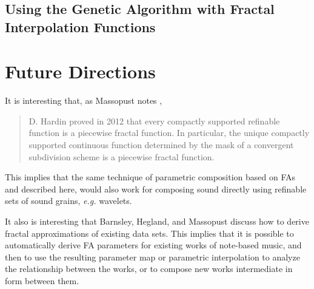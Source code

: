 \documentclass[english,11pt,letterpaper,onecolumn]{scrartcl}
\numberwithin{equation}{section}
\begin{document}
\subsection{Using the Genetic Algorithm with Fractal Interpolation
Functions}

\section{Future Directions}

It is interesting that, as Massopust notes \cite{massopust2017}, \begin{quote}D.
Hardin proved in 2012 that every compactly supported refinable function is a
piecewise fractal function. In particular, the unique compactly supported
continuous function determined by the mask of a convergent subdivision scheme is
a piecewise fractal function. \end{quote} This implies that the same technique
of parametric composition based on FAs and described here, would also work for
composing sound directly using refinable sets of sound grains, \textit{e.g.}
wavelets.

It also is interesting that Barnsley, Hegland, and Massopust
\cite{2013arXiv1309.0972B} discuss how to derive fractal approximations of
existing data sets. This implies that it is possible to automatically derive FA
parameters for existing works of note-based music, and then to use the resulting
parameter map or parametric interpolation to analyze the relationship between
the works, or to compose new works intermediate in form between them.

\printbibliography
\end{document}
